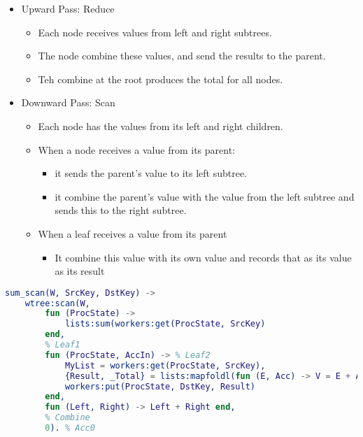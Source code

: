 \documentclass[../main.tex]{subfiles}
\begin{document}
\begin{itemize}
	\item {
	      Upward Pass: Reduce
	      \begin{itemize}
		      \item Each node receives values from left and right subtrees.
		      \item The node combine these values, and send the results to the parent.
		      \item Teh combine at the root produces the total for all nodes.
	      \end{itemize}
	      }
	\item {
	      Downward Pass: Scan
	      \begin{itemize}
		      \item Each node has the values from its left and right children.
		      \item {
		            When a node receives a value from its parent:
		            \begin{itemize}
			            \item it sends the parent's value to its left subtree.
			            \item it combine the parent's value with the value from the left subtree and sends this to the right subtree.
		            \end{itemize}
		            }
		      \item {
		            When a leaf receives a value from its parent
		            \begin{itemize}
			            \item It combine this value with its own value and records that as its value as its result
		            \end{itemize}
		            }
	      \end{itemize}
	      }
\end{itemize}

\begin{lstlisting}[language=erlang]
    sum_scan(W, SrcKey, DstKey) ->
    wtree:scan(W,
        fun (ProcState) ->
            lists:sum(workers:get(ProcState, SrcKey)
        end,
        % Leaf1
        fun (ProcState, AccIn) -> % Leaf2
            MyList = workers:get(ProcState, SrcKey),
            {Result, _Total} = lists:mapfoldl(fun (E, Acc) -> V = E + Acc, {V, V} end, AccIn, MyList),
            workers:put(ProcState, DstKey, Result)
        end,
        fun (Left, Right) -> Left + Right end,
        % Combine
        0). % Acc0
\end{lstlisting}
\end{document}
